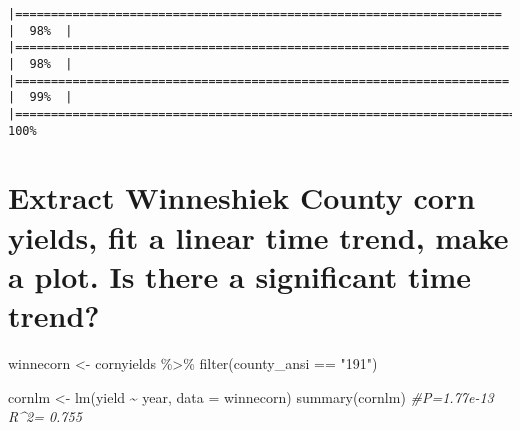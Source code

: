 \documentclass[
]{book}
\newenvironment{Shaded}{\begin{snugshade}}{\end{snugshade}}
\newcommand{\AttributeTok}[1]{\textcolor[rgb]{0.77,0.63,0.00}{#1}}
\newcommand{\CommentTok}[1]{\textcolor[rgb]{0.56,0.35,0.01}{\textit{#1}}}
\newcommand{\FunctionTok}[1]{\textcolor[rgb]{0.00,0.00,0.00}{#1}}
\newcommand{\NormalTok}[1]{#1}
\newcommand{\OtherTok}[1]{\textcolor[rgb]{0.56,0.35,0.01}{#1}}
\newcommand{\SpecialCharTok}[1]{\textcolor[rgb]{0.00,0.00,0.00}{#1}}
\newcommand{\StringTok}[1]{\textcolor[rgb]{0.31,0.60,0.02}{#1}}
\begin{document}
\begin{verbatim}
|====================================================================  |  98%  |                                                                              |===================================================================== |  98%  |                                                                              |===================================================================== |  99%  |                                                                              |======================================================================| 100%
\end{verbatim}

\begin{Shaded}
\end{Shaded}

\hypertarget{extract-winneshiek-county-corn-yields-fit-a-linear-time-trend-make-a-plot.-is-there-a-significant-time-trend}{%
\section{Extract Winneshiek County corn yields, fit a linear time trend, make a plot. Is there a significant time trend?}\label{extract-winneshiek-county-corn-yields-fit-a-linear-time-trend-make-a-plot.-is-there-a-significant-time-trend}}

\begin{Shaded}
\begin{Highlighting}[]
\NormalTok{winnecorn }\OtherTok{\textless{}{-}}\NormalTok{ cornyields }\SpecialCharTok{\%\textgreater{}\%}
  \FunctionTok{filter}\NormalTok{(county\_ansi }\SpecialCharTok{==} \StringTok{"191"}\NormalTok{)}

\NormalTok{cornlm }\OtherTok{\textless{}{-}} \FunctionTok{lm}\NormalTok{(yield }\SpecialCharTok{\textasciitilde{}}\NormalTok{ year, }\AttributeTok{data =}\NormalTok{ winnecorn)}
\FunctionTok{summary}\NormalTok{(cornlm) }\CommentTok{\#P=1.77e{-}13 R\^{}2= 0.755}
\end{Highlighting}
\end{Shaded}
\end{document}

